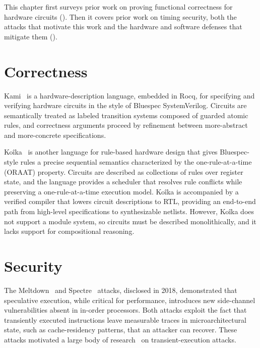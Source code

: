 \documentclass[fontset=fira-newtxsf]{mitthesis}
\theoremstyle{definition}
\theoremstyle{plain}
\begin{document}
This chapter first surveys prior work on proving functional correctness for hardware circuits ().
Then it covers prior work on timing security, both the attacks that motivate this work and the hardware and software defenses that mitigate them ().

\section{Correctness} \label{sec:related-correctness}

Kami~\cite{choi2017} is a hardware-description language, embedded in Rocq, for specifying and verifying hardware circuits in the style of Bluespec SystemVerilog.
Circuits are semantically treated as labeled transition systems composed of guarded atomic rules, and correctness arguments proceed by refinement between more-abstract and more-concrete specifications.

Ko\^{i}ka~\cite{koika2020} is another language for rule-based hardware design that gives Bluespec-style rules a precise sequential semantics characterized by the one-rule-at-a-time (ORAAT) property.
Circuits are described as collections of rules over register state, and the language provides a scheduler that resolves rule conflicts while preserving a one-rule-at-a-time execution model.
Ko\^{i}ka is accompanied by a verified compiler that lowers circuit descriptions to RTL, providing an end-to-end path from high-level specifications to synthesizable netlists.
However, Ko\^{i}ka does not support a module system, so circuits must be described monolithically, and it lacks support for compositional reasoning.

\section{Security} \label{sec:related-timing}

The Meltdown~\cite{lipp2018} and Spectre~\cite{kocher2019} attacks, disclosed in 2018, demonstrated that speculative execution, while critical for performance, introduces new side-channel vulnerabilities absent in in-order processors.
Both attacks exploit the fact that transiently executed instructions leave measurable traces in microarchitectural state, such as cache-residency patterns, that an attacker can recover.
These attacks motivated a large body of research~\cite{koruyeh2018,maisuradze2018,kiriansky2018,schwarz2019,minkin2019} on transient-execution attacks.
\end{document}
